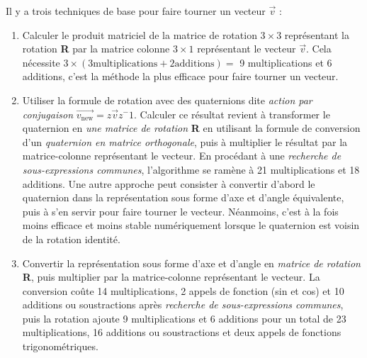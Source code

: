 Il y a trois techniques de base pour faire tourner un vecteur $\vec{v}$ :
\begin{enumerate}
	\item Calculer le produit matriciel de la matrice de rotation $3\times3$ représentant la 
	rotation \textbf{R} par la matrice colonne $3\times1$ représentant le vecteur $\vec{v}$.
	Cela nécessite $3 \times (3 \text{multiplications} + 2 \text{additions}) = $ 
	9 multiplications et 6 additions, c'est la méthode la plus efficace pour faire tourner 
	un vecteur.
	
	\item Utiliser la formule de rotation avec des quaternions dite \emph{action par conjugaison} $\vec{v_{\text{new}}} = z\vec{v}z^-1$.  Calculer ce résultat 
	revient à transformer le quaternion en \emph{une matrice de rotation} 
	\textbf{R}  en utilisant la formule de conversion d'un \emph{quaternion 
	en matrice orthogonale}, puis à multiplier le résultat par la
	matrice-colonne représentant le vecteur. 
	En procédant à une \emph{recherche de sous-expressions communes}, l'algorithme 
	se ramène à 21 multiplications et 18 additions. Une autre approche peut 
	consister à convertir d'abord le quaternion dans la représentation sous 
	forme d'axe et d'angle équivalente, puis à s'en servir pour faire tourner 
	le vecteur. Néanmoins, c'est à la fois moins efficace et moins stable 
	numériquement lorsque le quaternion est voisin de la rotation identité.
	
	\item Convertir la représentation sous forme d'axe et d'angle en 
	\emph{matrice de rotation} \textbf{R}, puis multiplier par la matrice-colonne 
	représentant le vecteur. La conversion coûte 14 multiplications, 
	2 appels de fonction (sin et cos) et 10 additions ou soustractions 
	après \emph{recherche de sous-expressions communes}, puis la rotation ajoute 
	9 multiplications et 6 additions pour un total de 23 multiplications, 
	16 additions ou soustractions et deux appels de fonctions trigonométriques.
\end{enumerate}

